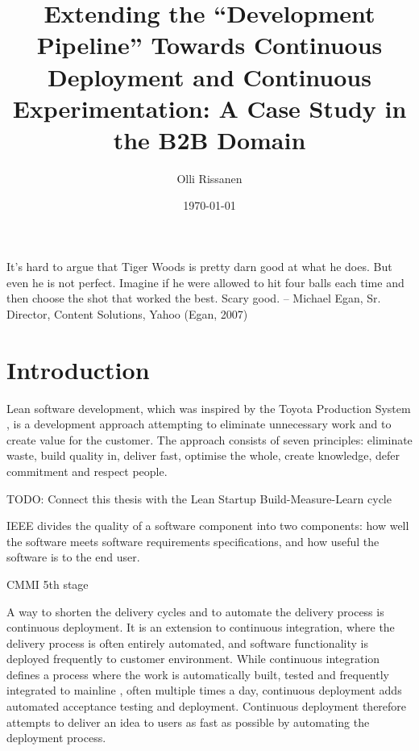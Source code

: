 \documentclass[english]{tktltiki2}
\title{Extending the “Development Pipeline” Towards Continuous Deployment and Continuous Experimentation: A Case Study in the B2B Domain}
\author{Olli Rissanen}
\date{\today}
\theoremstyle{definition}
\theoremstyle{remark}
\begin{document}

\frontmatter      %

\maketitle        %
\makeabstract     %

\tableofcontents  %


\newpage

It’s hard to argue that Tiger Woods is pretty darn good at what he does. But even he is not perfect. Imagine if
he were allowed to hit four balls each time and then choose the shot that worked the best. Scary good.
-- Michael Egan, Sr. Director, Content Solutions, Yahoo (Egan, 2007)

\mainmatter       %



 

\section{Introduction} %
Lean software development, which was inspired by the Toyota Production System \cite{}, is a development approach attempting to eliminate unnecessary work and to create value for the customer. The approach consists of seven principles: eliminate waste, build quality in, deliver fast, optimise the whole, create knowledge, defer commitment and respect people. 

TODO: Connect this thesis with the Lean Startup Build-Measure-Learn cycle

IEEE divides the quality of a software component into two components: how well the software meets software requirements specifications, and how useful the software is to the end user.

CMMI 5th stage

A way to shorten the delivery cycles and to automate the delivery process is continuous deployment. It is an extension to continuous integration, where the delivery process is often entirely automated, and software functionality is deployed frequently to customer environment. While continuous integration defines a process where the work is automatically built, tested and frequently integrated to mainline \cite{fowler2006continuous}, often multiple times a day, continuous deployment adds automated acceptance testing and deployment. Continuous deployment therefore attempts to deliver an idea to users as fast as possible by automating the deployment process.
\end{document}
